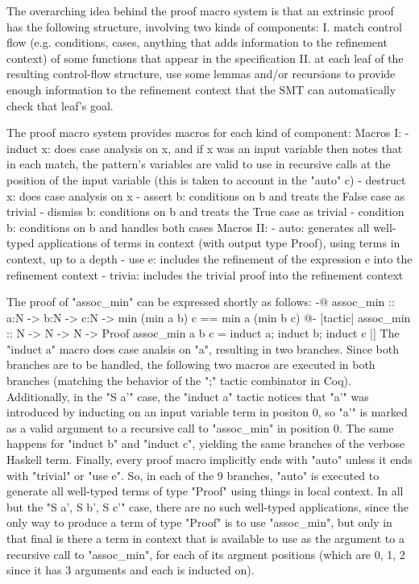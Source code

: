 The overarching idea behind the proof macro system is that an extrinsic proof has the following structure, involving two kinds of components:
I. match control flow (e.g. conditions, cases, anything that adds information to the refinement context) of some functions that appear in the specification
II. at each leaf of the resulting control-flow structure, use some lemmas and/or recursions to provide enough information to the refinement context that the SMT can automatically check that leaf's goal.

The proof macro system provides macros for each kind of component:
Macros I:
- induct x: does case analysis on x, and if x was an input variable then notes that in each match, the pattern's variables are valid to use in recursive calls at the position of the input variable (this is taken to account in the "auto" c)
- destruct x: does case analysis on x
- assert b: conditions on b and treats the False case as trivial 
- dismiss b: conditions on b and treats the True case as trivial
- condition b: conditions on b and handles both cases
Macros II:
- auto: generates all well-typed applications of terms in context (with output type Proof), using terms in context, up to a depth
- use e: includes the refinement of the expression e into the refinement context
- trivia: includes the trivial proof into the refinement context

The proof of "assoc_min" can be expressed shortly as follows:
  {-@ assoc_min :: a:N -> b:N -> c:N -> {min (min a b) c == min a (min b c)} @-}
  [tactic|
  assoc_min :: N -> N -> N -> Proof
  assoc_min a b c = induct a; induct b; induct c
  |]
The "induct a" macro does case analsis on "a", resulting in two branches. Since both branches are to be handled, the following two macros are executed in both branches (matching the behavior of the ";" tactic combinator in Coq).
Additionally, in the "S a'" case, the "induct a" tactic notices that "a'" was introduced by inducting on an input variable term in positon 0, so "a'" is marked as a valid argument to a recursive call to "assoc_min" in position 0.
The same happens for "induct b" and "induct c", yielding the same branches of the verbose Haskell term.
Finally, every proof macro implicitly ends with "auto" unless it ends with "trivial" or "use e".
So, in each of the 9 branches, "auto" is executed to generate all well-typed terms of type "Proof" using things in local context.
In all but the "S a', S b', S c'" case, there are no such well-typed applications, since the only way to produce a term of type "Proof" is to use "assoc_min", but only in that final is there a term in context that is available to use as the argument to a recursive call to "assoc_min", for each of its argment positions (which are 0, 1, 2 since it has 3 arguments and each is inducted on).

